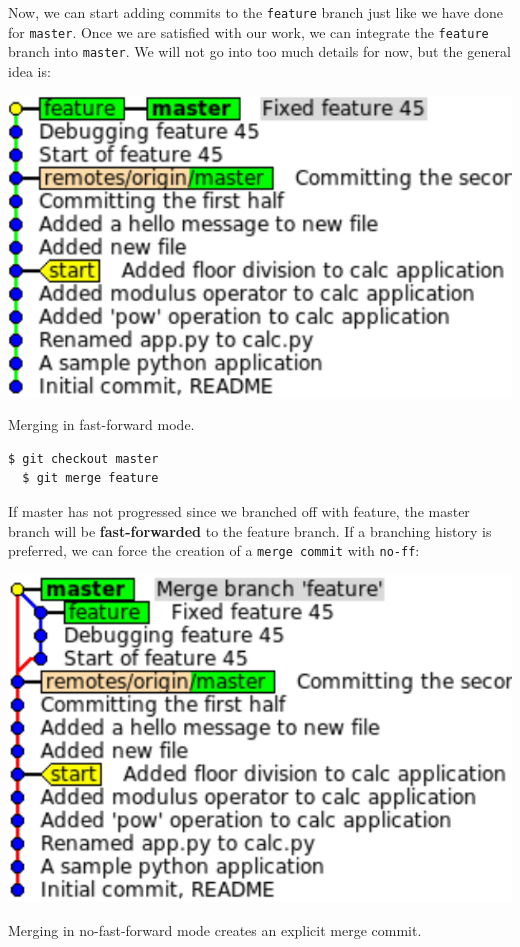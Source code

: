 \documentclass[a4paper]{../../common/tufte-latex/tufte-handout}
\begin{document}
Now, we can start adding commits to the \texttt{feature} branch just like we have done for \texttt{master}.
Once we are satisfied with our work, we can integrate the \texttt{feature} branch into \texttt{master}.
We will not go into too much details for now, but the general idea is:

\begin{marginfigure}%
  \centering
  \includegraphics[width=\linewidth]{gitmerge-ff.pdf}
  \label{fig:gitmerge-ff}
  \caption{Merging in fast-forward mode.}
\end{marginfigure}

\begin{lstlisting}[style=BashInputStyle]
  $ git checkout master
  $ git merge feature
\end{lstlisting}

If master has not progressed since we branched off with feature, the master branch will be \textbf{fast-forwarded} to the feature branch.
If a branching history is preferred, we can force the creation of a \texttt{merge commit} with \texttt{no-ff}:

\begin{marginfigure}%
  \centering
  \includegraphics[width=\linewidth]{gitmerge-noff.pdf}
  \label{fig:gitmerge-noff}
  \caption{Merging in no-fast-forward mode creates an explicit merge commit.}
\end{marginfigure}
\end{document}
